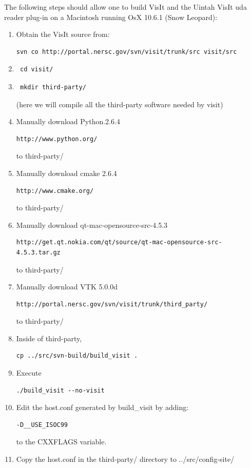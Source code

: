 \documentclass[12pt]{article}
\begin{document}
The following steps should allow one to build VisIt and the Uintah VisIt uda reader plug-in on a Macintosh running OsX 10.6.1 (Snow Leopard):
%
\begin{enumerate}
\item Obtain the VisIt source from:
\begin{verbatim}
svn co http://portal.nersc.gov/svn/visit/trunk/src visit/src
\end{verbatim}
\item \begin{verbatim} cd visit/ \end{verbatim}
\item \begin{verbatim} mkdir third-party/ \end{verbatim} (here we will compile all the third-party software needed by visit)
\item Manually download Python.2.6.4 
\begin{verbatim}
http://www.python.org/
\end{verbatim}
to third-party/
\item Manually download cmake 2.6.4 
\begin{verbatim}
http://www.cmake.org/
\end{verbatim}
to third-party/
\item Manually download qt-mac-opensource-src-4.5.3 
\begin{verbatim}
http://get.qt.nokia.com/qt/source/qt-mac-opensource-src-4.5.3.tar.gz
\end{verbatim}
to third-party/
\item Manually download VTK 5.0.0d 
\begin{verbatim}
http://portal.nersc.gov/svn/visit/trunk/third_party/
\end{verbatim}
to third-party/
\item Inside of third-party,
\begin{verbatim}
cp ../src/svn-build/build_visit . 
\end{verbatim}
\item Execute
\begin{verbatim}
./build_visit --no-visit 
\end{verbatim}
\item Edit the host.conf generated by build\_visit by adding: 
\begin{verbatim}
-D__USE_ISOC99
\end{verbatim} 
 to the CXXFLAGS variable. 
\item Copy the host.conf in the third-party/ directory to ../src/config-site/ 

\end{enumerate}
\end{document}

